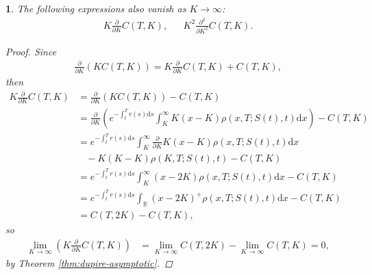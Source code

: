 \documentclass[english]{article}
\numberwithin{equation}{section}
\numberwithin{figure}{section}
\theoremstyle{bolddescit}
\theoremstyle{definition}
\theoremstyle{definition}
\theoremstyle{plain}
\newtheorem{lemma}[theorem]{\protect\lemmaname}
\theoremstyle{plain}
\theoremstyle{bolddesc}
\theoremstyle{plain}
\theoremstyle{remark}
\providecommand{\lemmaname}{Lemma}
\begin{document}
\begin{lemma}\label{lem:dupire-asymptotic-dK}
  The following expressions also vanish as $K \to \infty$:
  \begin{align*}
    K \frac{\partial}{\partial K} C(T,K), && K^2 \frac{\partial^2}{\partial K^2} C(T,K).
  \end{align*}

  \begin{proof}
    Since
    \begin{align*}
      \frac{\partial}{\partial K} (K C(T,K)) = K \frac{\partial}{\partial K} C(T,K) + C(T,K),
    \end{align*}
    then
    \begin{align*}
      K \frac{\partial}{\partial K} C(T,K)
      &= \frac{\partial}{\partial K} (K C(T,K)) - C(T,K)\\
      &= \frac{\partial}{\partial K} \left(e^{-\int_t^T r(s) \mathrm{d}s} \int_K^\infty K(x-K) \rho(x,T;S(t),t)\mathrm{d}x \right) - C(T,K)\\
      &= e^{-\int_t^T r(s) \mathrm{d}s} \int_K^\infty \frac{\partial}{\partial K} K(x-K) \rho(x,T;S(t),t)\mathrm{d}x\\
        &\ \ \ \ - K(K-K)\rho(K,T;S(t),t) - C(T,K) \tag{Leibniz integral rule}\\
      &= e^{-\int_t^T r(s) \mathrm{d}s} \int_K^\infty (x-2K) \rho(x,T;S(t),t)\mathrm{d}x - C(T,K)\\
      &= e^{-\int_t^T r(s) \mathrm{d}s} \int_\mathbb{R} (x-2K)^+ \rho(x,T;S(t),t)\mathrm{d}x - C(T,K)\\
      &= C(T,2K) - C(T,K),
    \end{align*}
    so
    \begin{align}
      \lim_{K \to \infty} \left(K \frac{\partial}{\partial K} C(T,K)\right)
      &= \lim_{K \to \infty} C(T,2K) - \lim_{K \to \infty} C(T,K)
      = 0,\label{eq:dupire-asymptotic-dK}
    \end{align}
    by Theorem \ref{thm:dupire-asymptotic}.


\end{proof}
\end{lemma}
\end{document}
